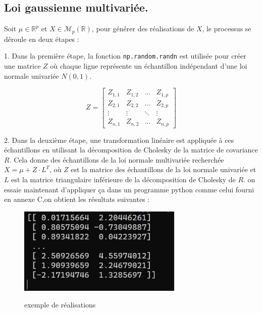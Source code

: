 \documentclass[a4paper]{article}
\begin{document}
\newpage

\subsection{Loi gaussienne multivariée.}
Soit \(\mu \in \mathbb{R}^p\) et \(X \in \mathcal{M}_p(\mathbb{R})\), pour générer des réalisations de \(X\), le processus se déroule en deux étapes :

1. Dans la première étape, la fonction \texttt{np.random.randn} est utilisée pour créer une matrice \(Z\) où chaque ligne représente un échantillon indépendant d'une loi normale univariée \(N(0,1)\).

\[
Z = \begin{bmatrix}
    Z_{1,1} & Z_{1,2} & \ldots & Z_{1,p} \\
    Z_{2,1} & Z_{2,2} & \ldots & Z_{2,p} \\
    \vdots  & \vdots  & \ddots & \vdots  \\
    Z_{n,1} & Z_{n,2} & \ldots & Z_{n,p}
\end{bmatrix}
\]

2. Dans la deuxième étape, une transformation linéaire est appliquée à ces échantillons en utilisant la décomposition de Cholesky de la matrice de covariance \(R\). Cela donne des échantillons de la loi normale multivariée recherchée \(X = \mu + Z \cdot L^T\), où \(Z\) est la matrice des échantillons de la loi normale univariée et \(L\) est la matrice triangulaire inférieure de la décomposition de Cholesky de \(R\).
on essaie maintenant d'appliquer ça dans un programme python comme celui fourni en annexe C,on obtient les résultats suivantes :
\begin{figure}[h]
  \centering
  \includegraphics[width=0.7\textwidth]{6.png}\\
  \caption{exemple de réalisations}
\end{figure}
\end{document}
